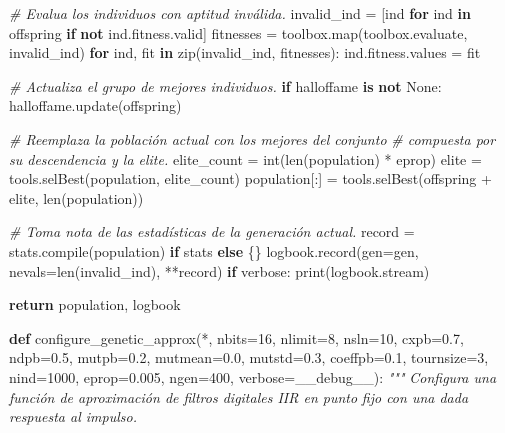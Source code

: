 \documentclass[11pt]{article}
\newenvironment{Shaded}{}{}
\newcommand{\KeywordTok}[1]{\textcolor[rgb]{0.00,0.44,0.13}{\textbf{{#1}}}}
\newcommand{\DecValTok}[1]{\textcolor[rgb]{0.25,0.63,0.44}{{#1}}}
\newcommand{\FloatTok}[1]{\textcolor[rgb]{0.25,0.63,0.44}{{#1}}}
\newcommand{\CommentTok}[1]{\textcolor[rgb]{0.38,0.63,0.69}{\textit{{#1}}}}
\newcommand{\NormalTok}[1]{{#1}}
\newcommand{\VariableTok}[1]{\textcolor[rgb]{0.10,0.09,0.49}{{#1}}}
\newcommand{\ControlFlowTok}[1]{\textcolor[rgb]{0.00,0.44,0.13}{\textbf{{#1}}}}
\newcommand{\OperatorTok}[1]{\textcolor[rgb]{0.40,0.40,0.40}{{#1}}}
\newcommand{\BuiltInTok}[1]{{#1}}
\begin{document}
\begin{Shaded}
\begin{Highlighting}[]
{        \CommentTok{# Evalua los individuos con aptitud inválida.}
\NormalTok{        invalid_ind }\OperatorTok{=}\NormalTok{ [ind }\ControlFlowTok{for}\NormalTok{ ind }\KeywordTok{in}\NormalTok{ offspring }\ControlFlowTok{if} \KeywordTok{not}\NormalTok{ ind.fitness.valid]}
\NormalTok{        fitnesses }\OperatorTok{=}\NormalTok{ toolbox.}\BuiltInTok{map}\NormalTok{(toolbox.evaluate, invalid_ind)}
        \ControlFlowTok{for}\NormalTok{ ind, fit }\KeywordTok{in} \BuiltInTok{zip}\NormalTok{(invalid_ind, fitnesses):}
\NormalTok{            ind.fitness.values }\OperatorTok{=}\NormalTok{ fit}

        \CommentTok{# Actualiza el grupo de mejores individuos.}
        \ControlFlowTok{if}\NormalTok{ halloffame }\KeywordTok{is} \KeywordTok{not} \VariableTok{None}\NormalTok{:}
\NormalTok{            halloffame.update(offspring)}

        \CommentTok{# Reemplaza la población actual con los mejores del conjunto}
        \CommentTok{# compuesta por su descendencia y la elite.}
\NormalTok{        elite_count }\OperatorTok{=} \BuiltInTok{int}\NormalTok{(}\BuiltInTok{len}\NormalTok{(population) }\OperatorTok{*}\NormalTok{ eprop)}
\NormalTok{        elite }\OperatorTok{=}\NormalTok{ tools.selBest(population, elite_count)}
\NormalTok{        population[:] }\OperatorTok{=}\NormalTok{ tools.selBest(offspring }\OperatorTok{+}\NormalTok{ elite, }\BuiltInTok{len}\NormalTok{(population))}

        \CommentTok{# Toma nota de las estadísticas de la generación actual.}
\NormalTok{        record }\OperatorTok{=}\NormalTok{ stats.}\BuiltInTok{compile}\NormalTok{(population) }\ControlFlowTok{if}\NormalTok{ stats }\ControlFlowTok{else}\NormalTok{ \{\}}
\NormalTok{        logbook.record(gen}\OperatorTok{=}\NormalTok{gen, nevals}\OperatorTok{=}\BuiltInTok{len}\NormalTok{(invalid_ind), }\OperatorTok{**}\NormalTok{record)}
        \ControlFlowTok{if}\NormalTok{ verbose:}
            \BuiltInTok{print}\NormalTok{(logbook.stream)}

    \ControlFlowTok{return}\NormalTok{ population, logbook}


\KeywordTok{def}\NormalTok{ configure_genetic_approx(}\OperatorTok{*}\NormalTok{, nbits}\OperatorTok{=}\DecValTok{16}\NormalTok{, nlimit}\OperatorTok{=}\DecValTok{8}\NormalTok{, nsln}\OperatorTok{=}\DecValTok{10}\NormalTok{, cxpb}\OperatorTok{=}\FloatTok{0.7}\NormalTok{, ndpb}\OperatorTok{=}\FloatTok{0.5}\NormalTok{,}
\NormalTok{                             mutpb}\OperatorTok{=}\FloatTok{0.2}\NormalTok{, mutmean}\OperatorTok{=}\FloatTok{0.0}\NormalTok{, mutstd}\OperatorTok{=}\FloatTok{0.3}\NormalTok{, coeffpb}\OperatorTok{=}\FloatTok{0.1}\NormalTok{,}
\NormalTok{                             tournsize}\OperatorTok{=}\DecValTok{3}\NormalTok{, nind}\OperatorTok{=}\DecValTok{1000}\NormalTok{, eprop}\OperatorTok{=}\FloatTok{0.005}\NormalTok{, ngen}\OperatorTok{=}\DecValTok{400}\NormalTok{,}
\NormalTok{                             verbose}\OperatorTok{=}\VariableTok{__debug__}\NormalTok{):}
    \CommentTok{"""}
\CommentTok{    Configura una función de aproximación de filtros digitales IIR en punto}
\CommentTok{    fijo con una dada respuesta al impulso.}

}
\end{Highlighting}
\end{Shaded}
\end{document}
